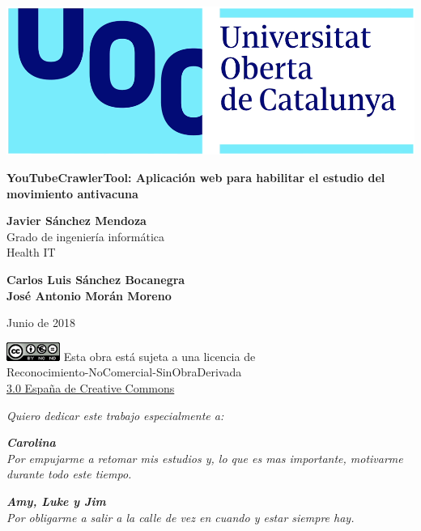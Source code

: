 \documentclass[11pt,a4paper]{article}
\begin{document}
\begin{titlepage}
\includegraphics[scale=0.2,right,valign=t]{uoc-logo.png}
\vspace*{\fill}
\begin{flushleft}
{\LARGE \textbf{YouTubeCrawlerTool: Aplicación web para habilitar el estudio del movimiento antivacuna}}
\end{flushleft}
\begin{flushleft}
\textbf{Javier Sánchez Mendoza}\\
Grado de ingeniería informática\\
Health IT
\end{flushleft}
\begin{flushleft}
\textbf{Carlos Luis Sánchez Bocanegra}\\
\textbf{José Antonio Morán Moreno}
\end{flushleft}
\begin{flushleft}
Junio de 2018  
\end{flushleft}
\end{titlepage}


\begin{titlepage}
\vspace*{\fill}
\begin{flushleft}
\includegraphics[scale=1,left]{licencia-cc.png}
Esta obra está sujeta a una licencia de\\
Reconocimiento-NoComercial-SinObraDerivada\\
\href{http://creativecommons.org/licenses/by-nc-nd/3.0/es/}{3.0 España de Creative Commons}
\end{flushleft}
\end{titlepage}



\begin{flushleft}
\textit{Quiero dedicar este trabajo especialmente a:}
\linebreak
 
\textbf{\textit{Carolina}} \\
\textit{Por empujarme a retomar mis estudios y, lo que es mas importante, motivarme durante todo este tiempo.}
\linebreak

\textbf{\textit{Amy, Luke y Jim}}\\
\textit{Por obligarme a salir a la calle de vez en cuando y estar siempre hay.}
\linebreak
\end{flushleft}
\newpage 
\end{document}
